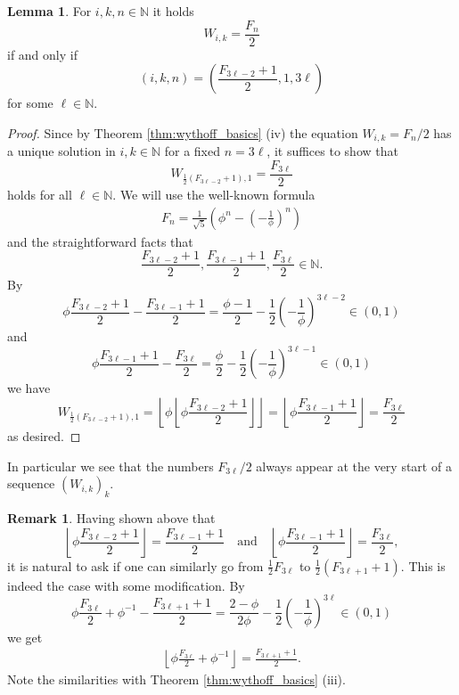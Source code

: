 \documentclass[]{interact}
\newcommand{\bbN}{\mathbb{N}}
\theoremstyle{definition}
\newtheorem{rem}[thm]{Remark}
\newtheorem{lem}[thm]{Lemma}
\numberwithin{table}{section} %
\numberwithin{figure}{section}
\begin{document}
\begin{lem} \label{lem:half_fib}
	For $i, k, n \in \bbN$ it holds
	$$
	W_{i, k} = \frac{F_n}2
	$$
	if and only if
	$$
	(i, k, n) = \left(\frac{F_{3\ell-2}+1}2, 1, 3 \ell\right)
	$$
	for some $\ell \in \bbN$.
\end{lem}
\begin{proof}
    Since by Theorem \ref{thm:wythoff_basics} (iv) the equation $W_{i, k} = {F_n}/2$ has a unique solution in $i, k \in \bbN$ for a fixed $n=3\ell$, it suffices to show that
    $$
    W_{\frac12(F_{3\ell-2}+1), 1} = \frac{F_{3\ell}}2
    $$
    holds for all $\ell \in \bbN$. We will use the well-known formula
    \begin{align} \label{eq:binet}
        F_n = \frac{1}{\sqrt5} \left( \phi^n - \left(-\frac1\phi\right)^n \right)
    \end{align}
    and the straightforward facts that
    $$
    \frac{F_{3\ell-2}+1}2, \frac{F_{3\ell-1}+1}2, \frac{F_{3\ell}}2 \in \bbN.
    $$
    By
    $$
    \phi \frac{F_{3\ell-2}+1}2 - \frac{F_{3\ell-1}+1}2 = \frac{\phi-1}2 - \frac12 \left(-\frac1\phi\right)^{3\ell-2} \in (0, 1)
    $$
    and
    $$
    \phi \frac{F_{3\ell-1}+1}2 - \frac{F_{3\ell}}2 = \frac{\phi}2 - \frac12 \left(-\frac1\phi\right)^{3\ell-1} \in (0, 1)
    $$
    we have
    $$
    W_{\frac12(F_{3\ell-2}+1), 1} = \left\lfloor \phi \left\lfloor \phi \frac{F_{3\ell-2}+1}2\right\rfloor \right\rfloor = \left\lfloor \phi \frac{F_{3\ell-1}+1}2 \right\rfloor = \frac{F_{3\ell}}2
    $$
    as desired.
\end{proof}

In particular we see that the numbers $F_{3\ell}/2$ always appear at the very start of a sequence $(W_{i, k})_k$.

\begin{rem}
    Having shown above that
    $$
    \left\lfloor \phi \frac{F_{3\ell-2}+1}2\right\rfloor = \frac{F_{3\ell-1}+1}2 \quad \text{and} \quad \left\lfloor \phi \frac{F_{3\ell-1}+1}2 \right\rfloor = \frac{F_{3\ell}}2,
    $$
    it is natural to ask if one can similarly go from $\frac12 F_{3\ell}$ to $\frac12(F_{3\ell+1}+1)$. This is indeed the case with some modification. By
    $$
	\phi \frac{F_{3\ell}}2 + \phi^{-1} - \frac{F_{3\ell+1}+1}2 = \frac{2-\phi}{2\phi} - \frac12 \left(-\frac1\phi\right)^{3\ell} \in (0, 1)
	$$
	we get
	\begin{align} \label{eq:rem_cont}
		\left\lfloor \phi \frac{F_{3\ell}}2  + \phi^{-1} \right\rfloor = \frac{F_{3\ell+1}+1}2.
	\end{align}
    Note the similarities with Theorem \ref{thm:wythoff_basics} (iii).
\end{rem}
\end{document}
